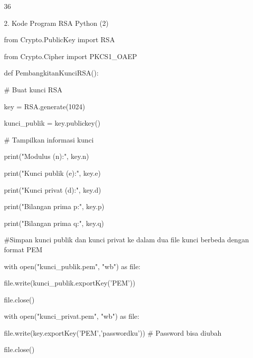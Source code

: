 \documentclass{article}
\begin{document}

36

2. Kode Program RSA Python (2)

from Crypto.PublicKey import RSA

from Crypto.Cipher import PKCS1\_OAEP

def PembangkitanKunciRSA():

    \# Buat kunci RSA

    key = RSA.generate(1024)

    kunci\_publik = key.publickey()


    \# Tampilkan informasi kunci

    print("Modulus (n):", key.n)

    print("Kunci publik (e):", key.e)

    print("Kunci privat (d):", key.d)

    print("Bilangan prima p:", key.p)

    print("Bilangan prima q:", key.q)

    \#Simpan kunci publik dan kunci privat ke dalam dua file kunci berbeda dengan format PEM

    with open("kunci\_publik.pem", "wb") as file:

         file.write(kunci\_publik.exportKey('PEM'))

         file.close()

    with open("kunci\_privat.pem", "wb") as file:

         file.write(key.exportKey('PEM','passwordku'))  \# Password bisa diubah

         file.close()
\end{document}
